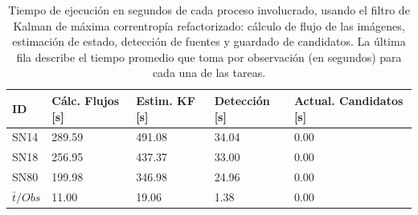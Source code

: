 \begin{table}[h!]
\centering
\caption{Tiempo de ejecuci\'on en segundos de cada proceso involucrado, usando el filtro de Kalman de m\'axima correntrop\'ia refactorizado: c\'alculo de flujo de las im\'agenes, estimaci\'on de estado, detecci\'on de fuentes y guardado de candidatos. La \'ultima fila describe el tiempo promedio que toma por observaci\'on (en segundos) para cada una de las tareas.}
\begin{tabular}{|l|l|l|l|l|}
\hline
\textbf{ID} & \textbf{C\'alc. Flujos [s]} & \textbf{Estim. KF [s]} &  \textbf{Detecci\'on [s]}  & \textbf{Actual. Candidatos [s]}\\ \hline \hline
SN14        & 289.59            & 491.08        &  34.04 & 0.00 \\ \hline
SN18            & 256.95             & 437.37         &  33.00  & 0.00\\ \hline
SN80            & 199.98             & 346.98         &   24.96 & 0.00 \\ \hline \hline
$\bar{t}/Obs$ & 11.00 &  19.06 & 1.38 & 0.00\\\hline 
\end{tabular}
\label{tab:t9}
\end{table}


